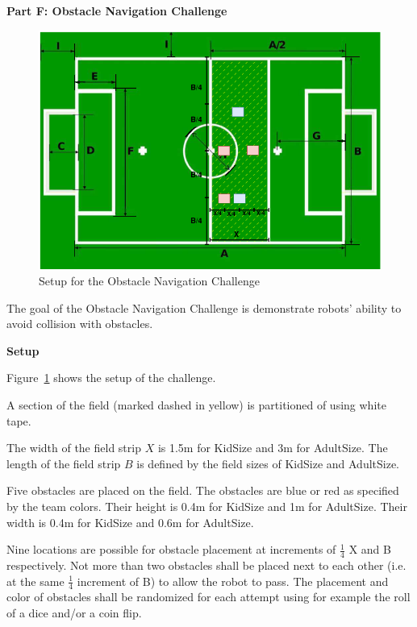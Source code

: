 \clearpage
\sffamily
{\bfseries\color[rgb]{0.4,0.4,0.4} Part F: Obstacle Navigation Challenge}
{}

\bigskip
\begin{figure}[h!]
\centering
\includegraphics[width=\linewidth]{img/tcnavigation.png}
\caption{Setup for the Obstacle Navigation Challenge}
\label{fig:obs-nav}
\end{figure}

The goal of the Obstacle Navigation Challenge is demonstrate robots' ability to avoid collision with obstacles.

\vspace{2em}
{\bfseries Setup}

Figure~\ref{fig:obs-nav} shows the setup of the challenge.

A section of the field (marked dashed in yellow) is partitioned of using white tape.

The width of the field strip $X$ is 1.5m for KidSize and 3m for AdultSize. The length of the field strip $B$ is defined by the field sizes of KidSize and AdultSize.

Five obstacles are placed on the field. The obstacles are blue or red as specified by the team colors. Their height is 0.4m for KidSize and 1m for AdultSize. Their width is 0.4m for KidSize and 0.6m for AdultSize.

Nine locations are possible for obstacle placement at increments of $\frac{1}{4}$ X and B respectively. Not more than two obstacles shall be placed next to each other (i.e. at the same $\frac{1}{4}$ increment of B) to allow the robot to pass. The placement and color of obstacles shall be randomized for each attempt using for example the roll of a dice and/or a coin flip. 

